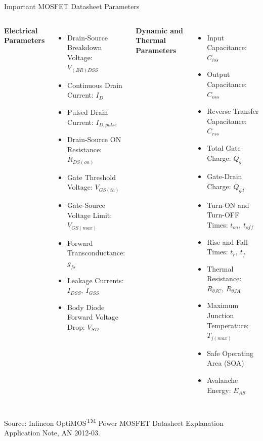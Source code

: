\begin{frame}{Important MOSFET Datasheet Parameters}
\begin{columns}[T]
\textbf{Electrical Parameters}
\begin{itemize}
    \item Drain-Source Breakdown Voltage: $V_{(BR)DSS}$
    \item Continuous Drain Current: $I_D$    
    \item Pulsed Drain Current: $I_{D,pulse}$
    \item Drain-Source ON Resistance: $R_{DS(on)}$
    \item Gate Threshold Voltage: $V_{GS(th)}$   
    \item Gate-Source Voltage Limit: $V_{GS(max)}$    
    \item Forward Transconductance: $g_{fs}$
    \item Leakage Currents: $I_{DSS},\ I_{GSS}$    
    \item Body Diode Forward Voltage Drop: $V_{SD}$
\end{itemize}


\textbf{Dynamic and Thermal Parameters}
\begin{itemize}
    \item Input Capacitance: $C_{iss}$    
    \item Output Capacitance: $C_{oss}$
    \item Reverse Transfer Capacitance: $C_{rss}$
    \item Total Gate Charge: $Q_g$    
    \item Gate-Drain Charge: $Q_{gd}$    
    \item Turn-ON and Turn-OFF Times: $t_{on},\ t_{off}$    
    \item Rise and Fall Times: $t_r,\ t_f$    
    \item Thermal Resistance: $R_{\theta JC},\ R_{\theta JA}$    
    \item Maximum Junction Temperature: $T_{j(max)}$
    \item Safe Operating Area (SOA)
    \item Avalanche Energy: $E_{AS}$
\end{itemize}
\end{columns}
\small
Source: Infineon OptiMOS\textsuperscript{TM} Power MOSFET Datasheet Explanation Application Note, AN 2012-03. 
\end{frame}


